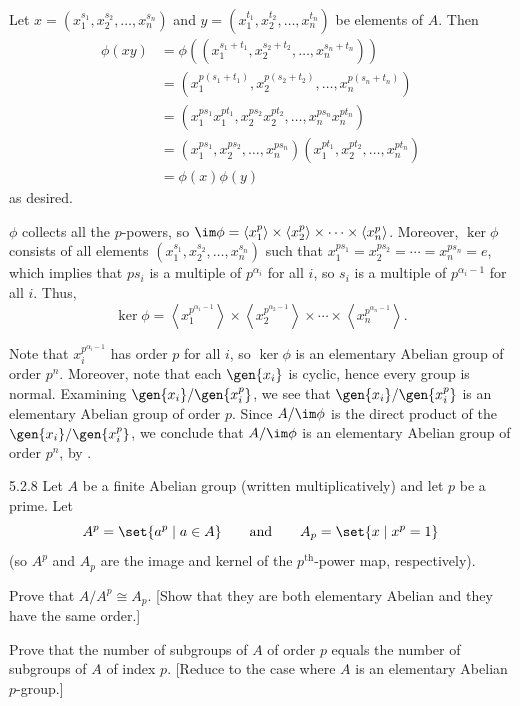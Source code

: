 \begin{solenum}
    \item Let $x = (x_1^{s_1}, x_2^{s_2}, \ldots, x_n^{s_n})$ and $y = (x_1^{t_1}, x_2^{t_2}, \ldots, x_n^{t_n})$ be elements of $A$.
	Then
    \begin{align*}
        \phi(xy) & = \phi((x_1^{s_1 + t_1}, x_2^{s_2 + t_2}, \ldots, x_n^{s_n + t_n})) \\
        & = (x_1^{p(s_1 + t_1)}, x_2^{p(s_2 + t_2)}, \ldots, x_n^{p(s_n + t_n)}) \\
        & = (x_1^{ps_1} x_1^{pt_1}, x_2^{ps_2} x_2^{pt_2}, \ldots, x_n^{ps_n} x_n^{pt_n}) \\
        & = (x_1^{ps_1}, x_2^{ps_2}, \ldots, x_n^{ps_n})(x_1^{pt_1}, x_2^{pt_2}, \ldots, x_n^{pt_n}) \\
        & = \phi(x)\phi(y)
    \end{align*}
    as desired.
    \item $\phi$ collects all the $p$-powers, so $\im\phi = \langle x_1^p \rangle \times \langle x_2^p \rangle \times \cdots \times \langle x_n^p \rangle$.
	Moreover, $\ker\phi$ consists of all elements $(x_1^{s_1}, x_2^{s_2}, \ldots, x_n^{s_n})$ such that $x_1^{ps_1} = x_2^{ps_2} = \cdots = x_n^{ps_n} = e$, which implies that $ps_i$ is a multiple of $p^{\alpha_i}$ for all $i$, so $s_i$ is a multiple of $p^{\alpha_i - 1}$ for all $i$.
	Thus,
    \[
    	\ker\phi = \left\langle x_1^{p^{\alpha_1-1}} \right\rangle \times \left\langle x_2^{p^{\alpha_2-1}} \right\rangle \times \cdots \times \left\langle x_n^{p^{\alpha_n-1}} \right\rangle.
    \]
    \item Note that $x_i^{p^{\alpha_i - 1}}$ has order $p$ for all $i$, so $\ker\phi$ is an elementary Abelian group of order $p^n$.
	Moreover, note that each $\gen{x_i}$ is cyclic, hence every group is normal.
	Examining $\gen{x_i} / \gen{x_i^p}$, we see that $\gen{x_i} / \gen{x_i^p}$ is an elementary Abelian group of order $p$.
	Since $A / \im\phi$ is the direct product of the $\gen{x_i} / \gen{x_i^p}$, we conclude that $A / \im\phi$ is an elementary Abelian group of order $p^n$, by .
\end{solenum}

\begin{exercise}{5.2.8}
    Let $A$ be a finite Abelian group (written multiplicatively) and let $p$ be a prime.
	Let
    \[
    	A^p = \set{a^p \mid a \in A} \qquad \text{and} \qquad A_p = \set{x \mid x^p = 1}
    \]
    (so $A^p$ and $A_p$ are the image and kernel of the $p^{\text{th}}$-power map, respectively).
    \begin{subexercises}
        \item Prove that $A/A^p \cong A_p$. [Show that they are both elementary Abelian and they have the same order.]
        \item Prove that the number of subgroups of $A$ of order $p$ equals the number of subgroups of $A$ of index $p$. [Reduce to the case where $A$ is an elementary Abelian $p$-group.]
    \end{subexercises}
\end{exercise}


